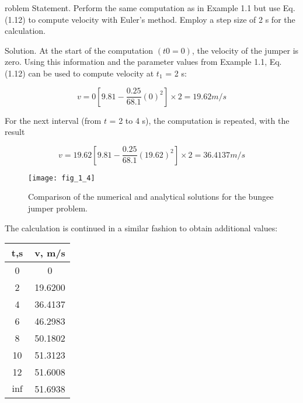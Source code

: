 \documentclass[../main.tex]{subfiles}
\begin{document}
roblem Statement. Perform the same computation as in Example 1.1 but use Eq. (1.12)
to compute velocity with Euler's method. Employ a step size of 2 s for the calculation.

Solution. At the start of the computation $(t0 = 0)$, the velocity of the jumper is zero.
Using this information and the parameter values from Example 1.1, Eq. (1.12) can be used
to compute velocity at $t_1$ = 2 s:

$$ v= 0 \left[ 9.81 - \dfrac{0.25}{68.1}(0)^2 \right] \times 2 = 19.62 m/s$$ 

For the next interval (from $t$ = 2 to 4 s), the computation is repeated, with the result

$$ v= 19.62 \left[ 9.81 - \dfrac{0.25}{68.1}(19.62)^2 \right] \times 2 = 36.4137 m/s$$ 

\begin{figure}[H]
	\centering
	\texttt{[image: fig\_1\_4]}
   \caption{\textsf{Comparison of the numerical and analytical solutions for the bungee jumper problem.}}
   \label{fig_1_4}
\end{figure}


The calculation is continued in a similar fashion to obtain additional values:


\begin{table}[H]
	\begin{tabular}{c c}
		\hline
		\textbf{t,s} & \textbf{v, m/s} \\ 
		\hline
			0 &0\\
			2 &19.6200\\
			4 &36.4137\\
			6& 46.2983\\
			8 &50.1802\\
			10 & 51.3123\\
			12& 51.6008\\
			$\inf$ &51.6938 \\
			\hline
		
	\end{tabular}
\end{table}
\end{document}
